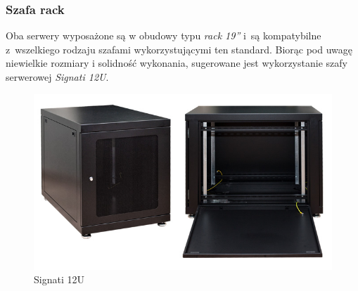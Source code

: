 \subsubsection{Szafa rack}

Oba serwery wyposażone są w obudowy typu \textit{rack 19''} i~są kompatybilne z~wszelkiego rodzaju szafami wykorzystującymi ten standard. Biorąc pod uwagę niewielkie rozmiary i solidność wykonania, sugerowane jest wykorzystanie szafy serwerowej \textit{Signati 12U}.

\begin{figure}[H]
  \includegraphics[width=\textwidth]{images/szafa_12U.jpg}
  \caption{Signati 12U}
\end{figure}